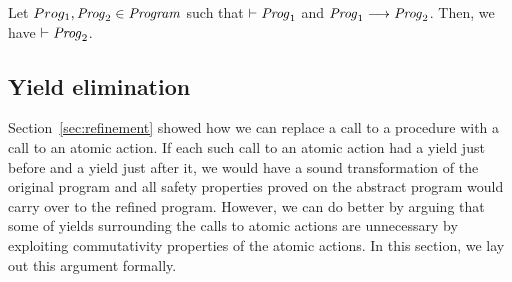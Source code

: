 \begin{lemma}
Let $Prog_1, \mathit{Prog}_2 \in \mathit{Program}$ such that $\vdash \mathit{Prog}_1$ and $\mathit{Prog}_1 \longrightarrow \mathit{Prog}_2$.
Then, we have $\vdash \mathit{Prog}_2$.
\end{lemma}

\subsection{Yield elimination}
\label{sec:yield-elimination}

Section~\ref{sec:refinement} showed how we can replace a call to a procedure with 
a call to an atomic action.
If each such call to an atomic action had a yield just before and a yield just after it,
we would have a sound transformation of the original program and all safety properties proved
on the abstract program would carry over to the refined program.
However, we can do better by arguing that some of yields surrounding the calls to atomic actions 
are unnecessary by exploiting commutativity properties of the atomic actions.
In this section, we lay out this argument formally.


